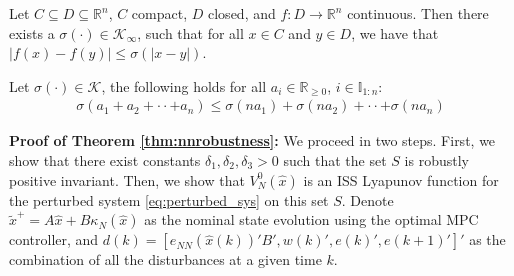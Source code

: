 \documentclass[preprint,5p, twocolumn, authoryear]{elsarticle}
\newcommand{\bbI}{\mathbb{I}}
\newcommand{\bbR}{\mathbb{R}}
\newcommand{\norm}[1]{\left| #1 \right|}
\newcommand{\xhat}{\hat{x}}
\begin{document}
\begin{prop} \label{prop:continuous_funcs} Let $C \subseteq D \subseteq \bbR^n$,
    $C$ compact, $D$ closed, and $f : D \rightarrow \bbR^n$ continuous.  
    Then there exists a $\sigma(\cdot) \in \mathcal{K}_{\infty}$, such that for
    all $x \in C$ and $y \in D$, we have that $\norm{f(x) - f(y)} \leq
    \sigma(\norm{x-y})$.
\end{prop}
    
\begin{prop} \label{prop:Kfunction_inequality} Let $\sigma(\cdot) \in
    \mathcal{K}$, the following holds for all $a_i \in \bbR_{\geq 0}$, $i \in
    \bbI_{1:n}$:
    \begin{align*}
        \sigma(a_1 + a_2 + \cdot \cdot + a_n) \leq \sigma(na_1) + 
        \sigma(na_2) + \cdot \cdot + \sigma(na_n)
    \end{align*}    
\end{prop}

\textbf{Proof of Theorem \ref{thm:nnrobustness}:} We proceed in two steps.
First, we show that there exist constants $\delta_1, \delta_2, \delta_3 > 0$
such that the set $S$ is robustly positive invariant. Then, we show that
$V_N^0(\xhat)$ is an ISS Lyapunov function for the perturbed system
\eqref{eq:perturbed_sys} on this set $S$. Denote $\tilde{x}^+ = A\xhat +
B\kappa_N(\xhat)$ as the nominal state evolution using the optimal MPC
controller, and $d(k) = [ e_{NN}(\xhat(k))'B', w(k)', e(k)', e(k+1)']'$ as the
combination of all the disturbances at a given time $k$. 
\end{document}
